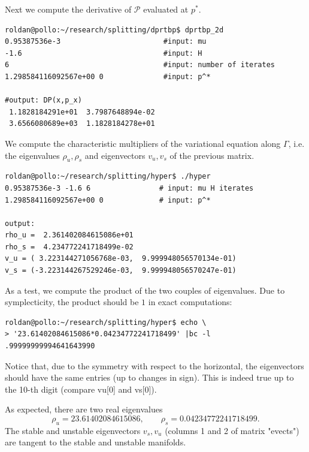 \documentclass[a4paper]{amsart}
\theoremstyle{remark}
\newcommand{\sixmap}{\mathcal{P}}
\begin{document}

Next we compute the derivative of $\sixmap$ evaluated at $p^*$.
\begin{verbatim}
roldan@pollo:~/research/splitting/dprtbp$ dprtbp_2d 
0.95387536e-3                        #input: mu
-1.6                                 #input: H
6                                    #input: number of iterates 
1.298584116092567e+00 0              #input: p^*

#output: DP(x,p_x)
 1.1828184291e+01  3.7987648894e-02
 3.6566080689e+03  1.1828184278e+01
\end{verbatim}

We compute the characteristic multipliers of the variational equation along
$\Gamma$, i.e. the eigenvalues $\rho_u, \rho_s$ and eigenvectors $v_u,
v_s$ of the previous matrix.

\begin{verbatim}
roldan@pollo:~/research/splitting/hyper$ ./hyper 
0.95387536e-3 -1.6 6                # input: mu H iterates
1.298584116092567e+00 0             # input: p^*

output:
rho_u =  2.361402084615086e+01
rho_s =  4.234772241718499e-02
v_u = ( 3.223144271056768e-03,  9.999948056570134e-01)
v_s = (-3.223144267529246e-03,  9.999948056570247e-01)
\end{verbatim}

As a test, we compute the product of the two couples of eigenvalues.
Due to symplecticity, the product should be $1$ in exact computations:

\begin{verbatim}
roldan@pollo:~/research/splitting/hyper$ echo \
> '23.61402084615086*0.04234772241718499' |bc -l
.99999999994641643990
\end{verbatim}

Notice that, due to the symmetry with respect to the horizontal, the
eigenvectors should have the same entries (up to changes in sign).
This is indeed true up to the 10-th digit (compare vu[0] and vs[0]).

As expected, there are two real eigenvalues
\[ \rho_u = 23.61402084615086, \qquad \rho_s = 0.04234772241718499. \]
The stable and unstable eigenvectors $v_s, v_u$ (columns 1 and 2 of matrix
"evects") are tangent to the stable and unstable manifolds. 
\end{document}
